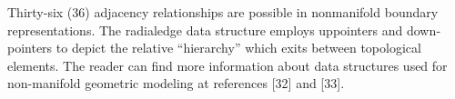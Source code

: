 \hspace{30} Thirty­-six   (36)   adjacency   relationships   are   possible   in   non­manifold   boundary  
representations.   The   radial­edge   data   structure   employs   up­pointers   and  
down­pointers   to   depict   the   relative   “hierarchy”   which   exits   between   topological  
elements.   The   reader   can   find   more   information   about   data   structures   used   for  
non-­manifold geometric modeling at references [32] and [33]. 


\clearpage
